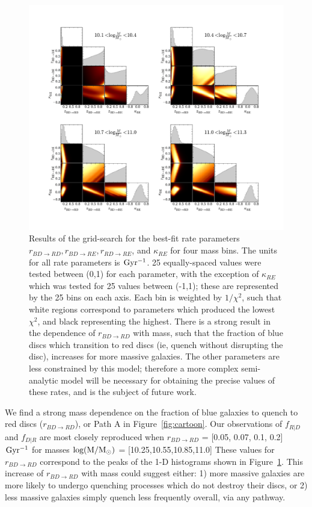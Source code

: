 \documentclass[useAMS,usenatbib]{mn2e}
\begin{document}
\begin{figure}
\centering
\includegraphics[width=\textwidth,trim={0cm 0cm 2cm 1cm},clip]{figures/corner_plot.pdf}
\caption{Results of the grid-search for the best-fit rate parameters $r_{BD \rightarrow RD}, r_{BD \rightarrow RE}, r_{RD \rightarrow RE}$, and $\kappa_{RE}$ for four mass bins. The units for all rate parameters is $\rm Gyr^{-1}$. 25 equally-spaced values were tested between (0,1) for each parameter, with the exception of $\kappa_{RE}$ which was tested for 25 values between (-1,1); these are represented by the 25 bins on each axis. Each bin is weighted by $1/\chi^2$, such that white regions correspond to parameters which produced the lowest $\chi^2$, and black representing the highest. There is a strong result in the dependence of $r_{BD \rightarrow RD}$ with mass, such that the fraction of blue discs which transition to red discs (ie, quench without disrupting the disc), increases for more massive galaxies. The other parameters are less constrained by this model; therefore a more complex semi-analytic model will be necessary for obtaining the precise values of these rates, and is the subject of future work.}
\label{fig:corner}
\end{figure} 

We find a strong mass dependence on the fraction of blue galaxies to quench to red discs ($r_{BD \rightarrow RD}$), or Path A in Figure~\ref{fig:cartoon}. Our observations of $f_{R|D}$ and $f_{D|R}$ are most closely reproduced when $r_{BD \rightarrow RD}$ = [0.05, 0.07, 0.1, 0.2] $\rm Gyr^{-1}$ for masses $\rm log(M/M_{\odot})$ = [10.25,10.55,10.85,11.0] These values for $r_{BD \rightarrow RD}$ correspond to the peaks of the 1-D histograms shown in Figure~\ref{fig:corner}. This increase of $r_{BD \rightarrow RD}$ with mass could suggest either: 1) more massive galaxies are more likely to undergo quenching processes which do not destroy their discs, or 2) less massive galaxies simply quench less frequently overall, via any pathway. 
\end{document}

